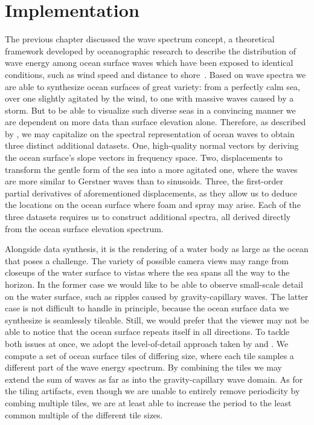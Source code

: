 \chapter{Implementation}
\label{ch:implementation}
%
The previous chapter discussed the wave spectrum concept, a theoretical
framework developed by oceanographic research to describe the distribution of
wave energy among ocean surface waves which have been exposed to identical
conditions, such as wind speed and distance to shore~\citep{Neumann:1966}.
Based on wave spectra we are able to synthesize ocean surfaces of great variety:
from a perfectly calm sea, over one slightly agitated by the wind, to one with
massive waves caused by a storm. %
But to be able to visualize such diverse seas in a convincing manner we are dependent on more data
than surface elevation alone. Therefore, as described by \citet{course:simulatingocean},
we may capitalize on the spectral representation of ocean waves to obtain
three distinct additional datasets.
One, high-quality normal vectors by deriving the ocean surface's slope vectors in frequency space.
Two, displacements to transform the gentle form of the sea into a more agitated one, where the waves are more similar to Gerstner waves than to sinusoids.
Three, the first-order partial derivatives of aforementioned displacements, as they allow us to deduce the locations on the ocean surface where
foam and spray may arise.
Each of the three datasets requires us to construct additional spectra,
all derived directly from the ocean surface elevation spectrum.

Alongside data synthesis, it is the rendering of a water body as large as the ocean
that poses a challenge. The variety of possible camera views
may range from closeups of the water surface to vistas where the sea spans all
the way to the horizon.
In the former case we would like to be able to observe small-scale detail on the
water surface, such as ripples caused by gravity-capillary waves.
The latter case is not difficult to handle in principle, because the ocean surface
data we synthesize is seamlessly tileable. Still, we would prefer that the viewer
may not be able to notice that the ocean surface repeats itself in all directions.
To tackle both issues at once, we adopt the level-of-detail approach taken by
\citet{misc:oceanlightingfft} and \citet{article:whitecaps}.
We compute a set of ocean surface tiles of differing size, where each tile samples a
different part of the wave energy spectrum. By combining the tiles we may
extend the sum of waves as far as into the gravity-capillary wave domain.
As for the tiling artifacts, even though we are unable to entirely remove periodicity
by combing multiple tiles, we are at least able to increase the period to the
least common multiple of the different tile sizes.


